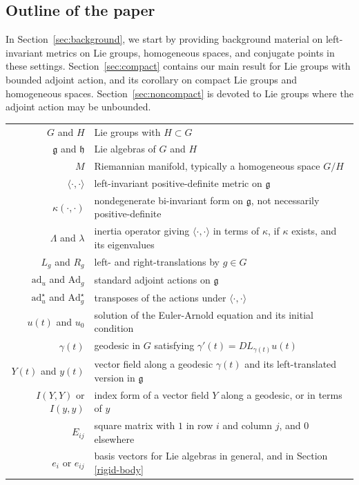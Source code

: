\documentclass[oneside, 11pt]{amsart}
\numberwithin{equation}{section}
\newcommand{\ad}{\mathrm{ad}}
\newcommand{\Ad}{\mathrm{Ad}}
\newcommand{\Adstar}{\Ad^{\star}}
\newcommand{\adstar}{\ad^{\star}}
\newcommand{\unit}{E}
\newcommand{\son}{e}
\newcommand{\heis}{e}
\begin{document}
\subsection{Outline of the paper} In Section~\ref{sec:background}, we start by providing background material on left-invariant metrics on Lie groups, homogeneous spaces, and conjugate points in these settings. Section~\ref{sec:compact} contains our main result for Lie groups with bounded adjoint action, and its corollary on compact Lie groups and homogeneous spaces. Section~\ref{sec:noncompact} is devoted to Lie groups where the adjoint action may be unbounded.


\begin{table}[h!]
\begin{tabular}{r|l}
\hline
$G$ and $H$ & Lie groups with $H\subset G$ \\
$\mathfrak{g}$ and $\mathfrak{h}$ & Lie algebras of $G$ and $H$ \\
$M$ & Riemannian manifold, typically a homogeneous space $G/H$ \\
$\langle\cdot, \cdot\rangle$ & left-invariant positive-definite metric on $\mathfrak{g}$ \\
$\kappa(\cdot,\cdot)$ & nondegenerate bi-invariant form on $\mathfrak{g}$, not necessarily positive-definite \\  
$\Lambda$ and $\lambda$ & inertia operator giving $\langle\cdot,\cdot\rangle$ in terms of $\kappa$, if $\kappa$ exists, and its eigenvalues \\
$L_g$ and $R_g$ & left- and right-translations by $g\in G$ \\
$\ad_u$ and $\Ad_g$ & standard adjoint actions on $\mathfrak{g}$ \\
$\adstar_u$ and $\Adstar_g$ & transposes of the actions under $\langle\cdot,\cdot\rangle$ \\
$u(t)$ and $u_0$ & solution of the Euler-Arnold equation and its initial condition \\
$\gamma(t)$ & geodesic in $G$ satisfying $\gamma'(t) = DL_{\gamma(t)}u(t)$ \\
$Y(t)$ and $y(t)$ & vector field along a geodesic $\gamma(t)$ and its left-translated version in $\mathfrak{g}$ \\
$I(Y,Y)$ or $I(y,y)$ & index form of a vector field $Y$ along a geodesic, or in terms of $y$ \\
$\unit_{ij}$ & square matrix with $1$ in row $i$ and column $j$, and $0$ elsewhere \\
$\heis_i$ or $\son_{ij}$ & basis vectors for Lie algebras in general, and in Section \ref{rigid-body}\\

\end{tabular}
\end{table}
\end{document}
